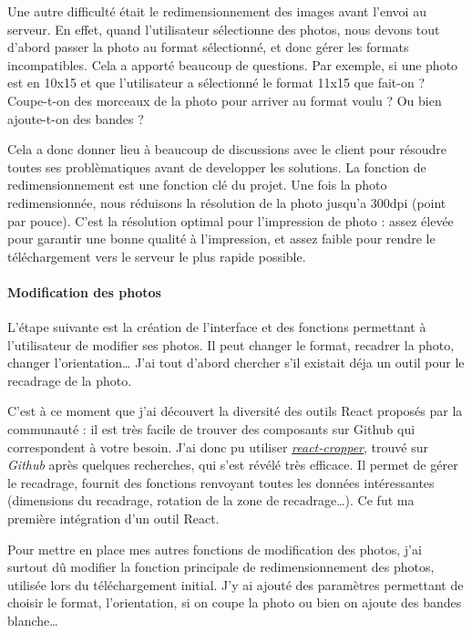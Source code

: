 \bigskip

Une autre difficulté était le redimensionnement des images avant l'envoi
au serveur. En effet, quand l'utilisateur sélectionne des photos, nous
devons tout d'abord passer la photo au format sélectionné, et donc gérer
les formats incompatibles. Cela a apporté beaucoup de questions. Par
exemple, si une photo est en 10x15 et que l'utilisateur a sélectionné le
format 11x15 que fait-on ? Coupe-t-on des morceaux de la photo pour
arriver au format voulu ? Ou bien ajoute-t-on des bandes ?

\bigskip

Cela a donc donner lieu à beaucoup de discussions avec le client pour
résoudre toutes ses problèmatiques avant de developper les solutions. La
fonction de redimensionnement est une fonction clé du projet. Une fois
la photo redimensionnée, nous réduisons la résolution de la photo
jusqu'a 300dpi (point par pouce). C'est la résolution optimal pour
l'impression de photo : assez élevée pour garantir une bonne qualité à
l'impression, et assez faible pour rendre le téléchargement vers le
serveur le plus rapide possible.

\bigskip

\paragraph{Modification des photos}\label{modification-des-photos}

\bigskip

L'étape suivante est la création de l'interface et des fonctions
permettant à l'utilisateur de modifier ses photos. Il peut changer le
format, recadrer la photo, changer l'orientation\ldots{} J'ai tout
d'abord chercher s'il existait déja un outil pour le recadrage de la
photo.

\bigskip

C'est à ce moment que j'ai découvert la diversité des outils React
proposés par la communauté : il est très facile de trouver des
composants sur Github qui correspondent à votre besoin. J'ai donc pu
utiliser
\href{https://github.com/roadmanfong/react-cropper}{\emph{react-cropper}},
trouvé sur \emph{Github} après quelques recherches, qui s'est révélé
très efficace. Il permet de gérer le recadrage, fournit des fonctions
renvoyant toutes les données intéressantes (dimensions du recadrage,
rotation de la zone de recadrage\ldots{}). Ce fut ma première
intégration d'un outil React.

\bigskip

Pour mettre en place mes autres fonctions de modification des photos,
j'ai surtout dû modifier la fonction principale de redimensionnement des
photos, utilisée lors du téléchargement initial. J'y ai ajouté des
paramètres permettant de choisir le format, l'orientation, si on coupe
la photo ou bien on ajoute des bandes blanche\ldots{}


